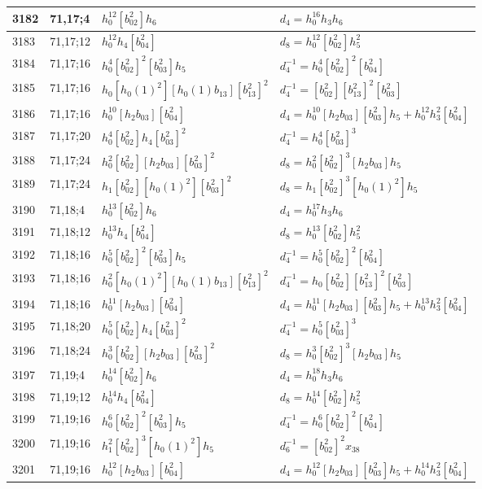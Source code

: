 \documentclass{article}
\begin{document}
\begin{longtable}{|l|l|>{\raggedright\arraybackslash}p{6cm}|>{\raggedright\arraybackslash}p{6cm}|}
\hline
3182 & 71,17;4 & $h_0^{12}[b_{02}^2]h_6$ &$d_{4}=h_0^{16}h_3h_6$\\
\hline
3183 & 71,17;12 & $h_0^{12}h_4[b_{04}^2]$ &$d_{8}=h_0^{12}[b_{02}^2]h_5^2$\\
\hline
3184 & 71,17;16 & $h_0^4[b_{02}^2]^2[b_{03}^2]h_5$ & $d_{4}^{-1}=h_0^4[b_{02}^2]^2[b_{04}^2]$\\
3185 & 71,17;16 & $h_0[h_0(1)^2][h_0(1)b_{13}][b_{13}^2]^2$ & $d_{4}^{-1}=[b_{02}^2][b_{13}^2]^2[b_{03}^2]$\\
3186 & 71,17;16 & $h_0^{10}[h_2b_{03}][b_{04}^2]$ &$d_{4}=h_0^{10}[h_2b_{03}][b_{03}^2]h_5 + h_0^{12}h_3^2[b_{04}^2]$\\
\hline
3187 & 71,17;20 & $h_0^4[b_{02}^2]h_4[b_{03}^2]^2$ & $d_{4}^{-1}=h_0^4[b_{03}^2]^3$\\
\hline
3188 & 71,17;24 & $h_0^2[b_{02}^2][h_2b_{03}][b_{03}^2]^2$ &$d_{8}=h_0^2[b_{02}^2]^3[h_2b_{03}]h_5$\\
3189 & 71,17;24 & $h_1[b_{02}^2][h_0(1)^2][b_{03}^2]^2$ &$d_{8}=h_1[b_{02}^2]^3[h_0(1)^2]h_5$\\
\hline
3190 & 71,18;4 & $h_0^{13}[b_{02}^2]h_6$ &$d_{4}=h_0^{17}h_3h_6$\\
\hline
3191 & 71,18;12 & $h_0^{13}h_4[b_{04}^2]$ &$d_{8}=h_0^{13}[b_{02}^2]h_5^2$\\
\hline
3192 & 71,18;16 & $h_0^5[b_{02}^2]^2[b_{03}^2]h_5$ & $d_{4}^{-1}=h_0^5[b_{02}^2]^2[b_{04}^2]$\\
3193 & 71,18;16 & $h_0^2[h_0(1)^2][h_0(1)b_{13}][b_{13}^2]^2$ & $d_{4}^{-1}=h_0[b_{02}^2][b_{13}^2]^2[b_{03}^2]$\\
3194 & 71,18;16 & $h_0^{11}[h_2b_{03}][b_{04}^2]$ &$d_{4}=h_0^{11}[h_2b_{03}][b_{03}^2]h_5 + h_0^{13}h_3^2[b_{04}^2]$\\
\hline
3195 & 71,18;20 & $h_0^5[b_{02}^2]h_4[b_{03}^2]^2$ & $d_{4}^{-1}=h_0^5[b_{03}^2]^3$\\
\hline
3196 & 71,18;24 & $h_0^3[b_{02}^2][h_2b_{03}][b_{03}^2]^2$ &$d_{8}=h_0^3[b_{02}^2]^3[h_2b_{03}]h_5$\\
\hline
3197 & 71,19;4 & $h_0^{14}[b_{02}^2]h_6$ &$d_{4}=h_0^{18}h_3h_6$\\
\hline
3198 & 71,19;12 & $h_0^{14}h_4[b_{04}^2]$ &$d_{8}=h_0^{14}[b_{02}^2]h_5^2$\\
\hline
3199 & 71,19;16 & $h_0^6[b_{02}^2]^2[b_{03}^2]h_5$ & $d_{4}^{-1}=h_0^6[b_{02}^2]^2[b_{04}^2]$\\
3200 & 71,19;16 & $h_1^2[b_{02}^2]^3[h_0(1)^2]h_5$ & $d_{6}^{-1}=[b_{02}^2]^2x_{38}$\\
3201 & 71,19;16 & $h_0^{12}[h_2b_{03}][b_{04}^2]$ &$d_{4}=h_0^{12}[h_2b_{03}][b_{03}^2]h_5 + h_0^{14}h_3^2[b_{04}^2]$\\

\end{longtable}
\end{document}
